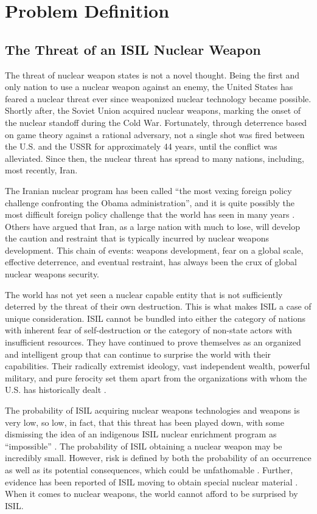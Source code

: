 \documentclass{report}
\begin{document}
\chapter{Problem Definition}

\section{The Threat of an ISIL  Nuclear Weapon}

The threat of  nuclear weapon states is not a novel thought. Being the first and only nation to use a nuclear weapon against an enemy, the United States has feared a nuclear threat ever since weaponized nuclear technology became possible. Shortly after, the Soviet Union acquired nuclear weapons, marking the onset of the nuclear standoff during the Cold War.   Fortunately, through deterrence based on game theory against a rational adversary, not a single shot was fired between the U.S. and the USSR for approximately 44 years, until the conflict was alleviated. Since then, the nuclear threat has spread to many nations, including, most recently, Iran. 

The Iranian nuclear program has been called \enquote{the most vexing foreign policy challenge confronting the Obama administration}, and it is quite possibly the most difficult foreign policy challenge that the world has seen in many years \cite{Edelman2011}. Others have argued that Iran, as a large nation with much to lose, will develop the caution and restraint that is typically incurred by nuclear weapons development. This chain of events: weapons development, fear on a global scale, effective deterrence, and eventual restraint, has always been the crux of global nuclear weapons security. 

The world has not yet seen a nuclear capable entity    that is not sufficiently deterred by the threat of their own destruction. This is what makes ISIL a case of unique consideration. ISIL cannot be bundled into either the category of nations with inherent fear of self-destruction or the category of non-state actors with insufficient resources. They have continued to prove themselves as an organized and intelligent group that can continue to surprise the world with their capabilities. Their radically extremist ideology, vast independent wealth, powerful military, and pure ferocity set them apart from the organizations with whom the U.S. has historically dealt  \cite{bach2015isis}. 

The probability of ISIL acquiring nuclear weapons technologies and weapons is very low, so low, in fact, that this threat has been played down, with some dismissing the idea of an indigenous ISIL nuclear enrichment program as \enquote{impossible} \cite{AlexanderSmith2014,Cirincione2014}. The probability of ISIL obtaining a nuclear weapon may be incredibly small. However, risk is defined by both the probability of an occurrence as well as its potential consequences, which could be unfathomable \cite{ONeill1997}. Further, evidence  has  been reported  of ISIL  moving to obtain special nuclear material \cite{AlexanderSmith2014}. When it comes to nuclear weapons, the world cannot afford to be  surprised by ISIL. 
\end{document}
